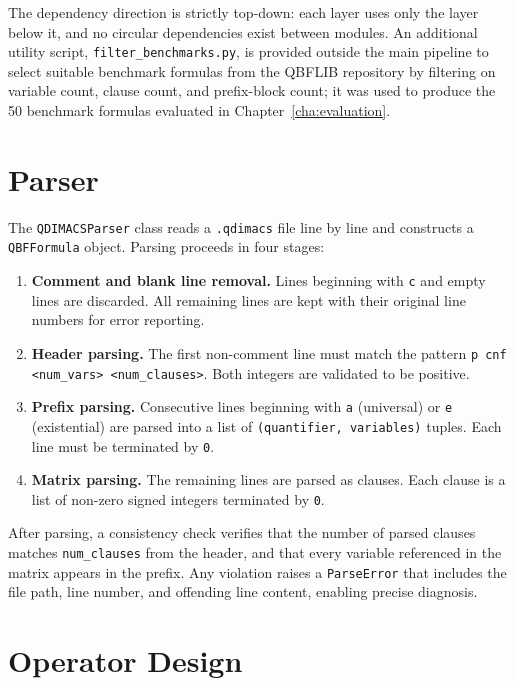 The dependency direction is strictly top-down: each layer uses only 
the layer below it, and no circular dependencies exist between 
modules. An additional utility script, \texttt{filter\_benchmarks.py}, 
is provided outside the main pipeline to select suitable benchmark formulas 
from the QBFLIB repository by filtering on variable count, clause count, 
and prefix-block count; it was used to produce the 50 
benchmark formulas evaluated in Chapter~\ref{cha:evaluation}.

\section{Parser}\label{sec:parser}

The \texttt{QDIMACSParser} class reads a \texttt{.qdimacs} file line by line and constructs a \texttt{QBFFormula} object. Parsing proceeds in four stages:

\begin{enumerate}
  \item \textbf{Comment and blank line removal.} Lines beginning with \texttt{c} and empty lines are discarded. All remaining lines are kept with their original line numbers for error reporting.
  \item \textbf{Header parsing.} The first non-comment line must match the pattern \texttt{p cnf <num\_vars> <num\_clauses>}. Both integers are validated to be positive.
  \item \textbf{Prefix parsing.} Consecutive lines beginning with \texttt{a} (universal) or \texttt{e} (existential) are parsed into a list of \texttt{(quantifier, variables)} tuples. Each line must be terminated by \texttt{0}.
  \item \textbf{Matrix parsing.} The remaining lines are parsed as clauses. Each clause is a list of non-zero signed integers terminated by \texttt{0}.
\end{enumerate}

After parsing, a consistency check verifies that the number of parsed clauses matches \texttt{num\_clauses} from the header, and that every variable referenced in the matrix appears in the prefix. Any violation raises a \texttt{ParseError} that includes the file path, line number, and offending line content, enabling precise diagnosis.

\section{Operator Design}\label{sec:operators-impl}

